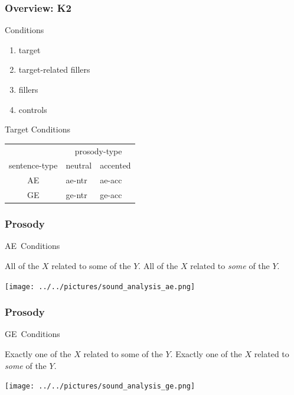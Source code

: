 \documentclass[fleqn,10pt,serif,xcolor=dvipsnames]{beamer}
\renewcommand{\AE}{AE\xspace}
\newcommand{\GE}{GE\xspace}
\begin{document}
\begin{frame}
  \frametitle{Overview: K2}
  \begin{block}{Conditions}
    \begin{enumerate}
    \item target
    \item target-related fillers
    \item fillers
    \item controls
    \end{enumerate}
  \end{block}

  \begin{block}{Target Conditions}
      \begin{center}
        \begin{tabular}{cll}
          & \multicolumn{2}{c}{prosody-type} \\ 
          sentence-type & neutral & accented \\ \midrule
          \AE & ae-ntr & ae-acc \\
          \GE & ge-ntr & ge-acc\\
        \end{tabular}
      \end{center}
  \end{block}

\end{frame}

\begin{frame}
  \frametitle{Prosody}
  \begin{block}{\AE\ Conditions}
    \begin{exe}
      \ex
      \begin{xlist}
      \ex All of the $X$ related to some of the $Y$.
      \ex All of the $X$ related to \emph{some} of the $Y$.
      \end{xlist}
    \end{exe}

    \medskip

      \texttt{[image: ../../pictures/sound\_analysis\_ae.png]}

  \end{block}
\end{frame}


\begin{frame}
  \frametitle{Prosody}
  \begin{block}{\GE\ Conditions}
    \begin{exe}
      \ex
      \begin{xlist}
      \ex Exactly one of the $X$ related to some of the $Y$.
      \ex Exactly one of the $X$ related to \emph{some} of the $Y$.
      \end{xlist}
    \end{exe}

    \medskip

      \texttt{[image: ../../pictures/sound\_analysis\_ge.png]}

  \end{block}
\end{frame}
\end{document}
